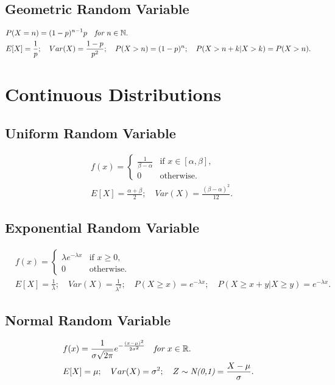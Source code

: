 \documentclass{article}
\begin{document}
\subsection{Geometric Random Variable}
\begin{align}
    & P(X=n) = (1-p)^{n-1}p \quad \emph{for } n \in \mathbb{N}. \nonumber \\
    & E[X] = \frac{1}{p}; \quad Var(X) = \frac{1-p}{p^2}; \quad P(X > n) = (1-p)^n ; \quad P(X>n+k|X>k) = P(X>n). \nonumber
\end{align}

\newpage
\section{Continuous Distributions}
\subsection{Uniform Random Variable}
\begin{align}
    & f(x) = \begin{cases}
        \frac{1}{\beta-\alpha} & \text{if $x \in [\alpha, \beta]$}, \\
        0 & \text{otherwise}.
    \end{cases} \nonumber \\
    & E[X] = \frac{\alpha+\beta}{2}; \quad Var(X) = \frac{(\beta-\alpha)^2}{12}. \nonumber
\end{align}

\subsection{Exponential Random Variable}
\begin{align}
    & f(x) = \begin{cases}
        \lambda e^{-\lambda x} & \text{if $x \ge 0$}, \\
        0 & \text{otherwise}.
    \end{cases} \nonumber \\
    & E[X] = \frac{1}{\lambda}; \quad Var(X) = \frac{1}{\lambda^2}; \quad P(X\ge x) = e^{-\lambda x}; \quad P(X\ge x + y|X\ge y) = e^{-\lambda x}. \nonumber
\end{align}

\subsection{Normal Random Variable}
\begin{align}
    & f(x) = \frac{1}{\sigma\sqrt{2\pi}} e^{-\frac{(x-\mu)^2}{2\sigma^2}} \quad \emph{for $x\in \mathbb{R}$}. \nonumber \\
    & E[X] = \mu; \quad Var(X) = \sigma^2; \quad Z \sim \emph{N(0,1)} = \frac{X-\mu}{\sigma}. \nonumber
\end{align}
\end{document}
